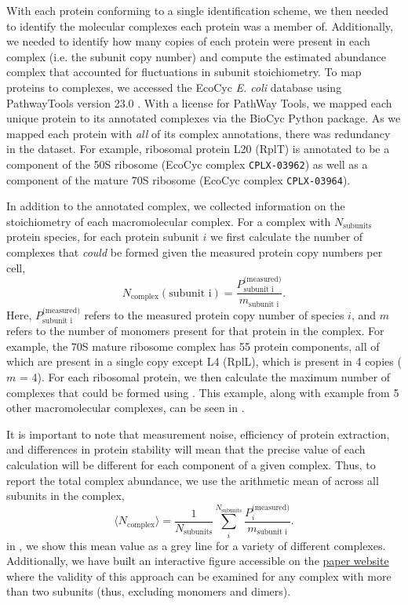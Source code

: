 With each protein conforming to a single identification
scheme, we then needed to identify the molecular complexes each protein was a
member of. Additionally, we needed to identify how many copies of each protein
were present in each complex (i.e. the subunit copy number) and compute the
estimated abundance complex that accounted for fluctuations in subunit
stoichiometry. To map proteins to complexes, we accessed the
EcoCyc \textit{E. coli} database \cite{keseler2017} using PathwayTools version
23.0 \cite{karp2019}. With a license for PathWay Tools, we
mapped each unique protein to its annotated complexes via the
BioCyc Python package. As we mapped each protein with \textit{all} of its
complex annotations, there was redundancy in the dataset. For example, ribosomal
protein L20 (RplT) is annotated to be a component of the 50S ribosome (EcoCyc
complex \texttt{CPLX-03962}) as well as a component of the mature 70S ribosome
(EcoCyc complex \texttt{CPLX-03964}).

In addition to the annotated complex, we collected information on the
stoichiometry of each macromolecular complex. For a complex with $N_\text{subunits}$ protein species,
for each protein subunit $i$ we first calculate the number of complexes that
\textit{could} be formed given the measured protein copy numbers per cell,
\begin{equation}
    N_\text{complex}(\text{subunit i}) = \frac{P_\text{subunit i}^\text{(measured)}}{m_\text{subunit i}}.
    \label{eq:subunit_max}
\end{equation}
Here, $P_\text{subunit i}^\text{(measured)}$ refers to the measured protein copy number of species $i$,
and $m$ refers to the number of monomers present for that protein in the complex. For example, the 70S mature ribosome complex has 55 protein components, all of
which are present in a single copy except L4 (RplL), which is present in 4
copies ($m$ = 4). For each ribosomal protein, we then calculate the  maximum number of
complexes that could be formed using . This example, along with
example from 5 other macromolecular complexes, can be seen in
.

It is important to note that measurement noise, efficiency of protein
extraction, and differences in protein stability will mean that the precise value of each
calculation will be different for each component of a given complex. Thus, to
report the total complex abundance, we use the arithmetic mean of
across all subunits in the complex,
\begin{equation}
   \langle N_\text{complex} \rangle = \frac{1}{N_\text{subunits}}\sum\limits_i^{N_\text{subunits}} \frac{P_{i}^\text{(measured)}}{m_\text{subunit i}}.
   \label{eq:complex_count}
\end{equation}
in , we show this mean value as a grey line for a variety
of different complexes. Additionally, we have built an interactive figure
accessible on the \href{https://www.rpgroup.caltech.edu/growth_limits}{paper
website} where the validity of this approach can be examined for any complex
with more than two subunits (thus, excluding monomers and dimers).

